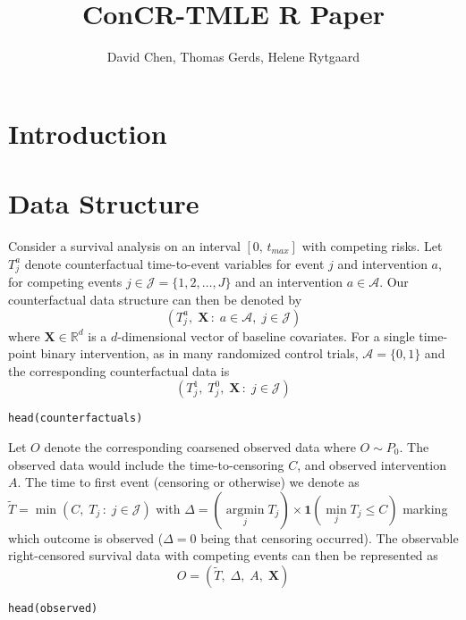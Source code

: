 \documentclass{report}
\author{David Chen, Thomas Gerds, Helene Rytgaard}
\date{}
\title{ConCR-TMLE R Paper}
\newcommand{\1}{\ensuremath{\mathbf{1}}}
\DeclareMathOperator*{\argmin}{argmin}
\newcommand{\T}{\ensuremath{\widetilde{T}}}
\newcommand{\X}{\ensuremath{\mathbf{X}}}
\begin{document}
\maketitle
{}

\section*{Introduction}
\label{sec:orgc11b9df}

\section*{Data Structure}
\label{sec:org50e1f4c}

Consider a survival analysis on an interval \([0,\,t_{max}]\) with competing risks. Let \(T^a_j\) denote counterfactual time-to-event variables for event \(j\) and intervention \(a\), for competing events \(j \in \mathcal{J} = \{1, 2, \dots, J\}\) and an intervention \(a \in \mathcal{A}\). Our counterfactual data structure can then be denoted by
\[(T^a_j,\;\X\,:\;a\in\mathcal{A},\;j\in\mathcal{J})\]
where \(\X \in \mathbb{R}^d\) is a \(d\)-dimensional vector of baseline covariates. For a single time-point binary intervention, as in many randomized control trials, \(\mathcal{A} = \{0, 1\}\) and the corresponding counterfactual data is 
\[ (T^1_j,\; T^0_j,\;\X\,: \;j\in\mathcal{J})\]

\begin{lstlisting}
head(counterfactuals)
\end{lstlisting}

\noindent Let $O$ denote the corresponding coarsened observed data where $O \sim P_0$. The observed data would include the time-to-censoring $C$, and observed intervention $A$. The time to first event (censoring or otherwise) we denote as $\T = \min(C,\; T_j\,: \; j \in \mathcal{J})$ with $\Delta = (\argmin\limits_j T_j) \times \1(\min\limits_j T_j \leq C)$ marking which outcome is observed ($\Delta = 0$ being that censoring occurred). The observable right-censored survival data with competing events can then be represented as 
\[O = (\T,\;\Delta,\;A,\;\X)\]

\begin{lstlisting}
head(observed)
\end{lstlisting}
\end{document}
